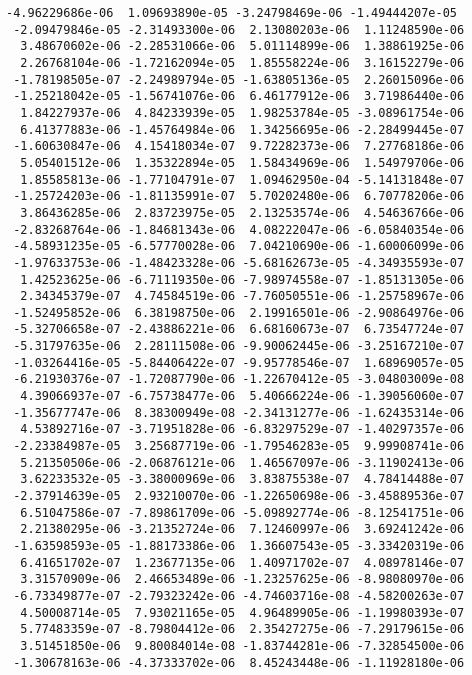 \documentclass[11pt]{article}
\begin{document}
\begin{Verbatim}[commandchars=\\\{\}]
 -4.96229686e-06  1.09693890e-05 -3.24798469e-06 -1.49444207e-05
 -2.09479846e-05 -2.31493300e-06  2.13080203e-06  1.11248590e-06
  3.48670602e-06 -2.28531066e-06  5.01114899e-06  1.38861925e-06
  2.26768104e-06 -1.72162094e-05  1.85558224e-06  3.16152279e-06
 -1.78198505e-07 -2.24989794e-05 -1.63805136e-05  2.26015096e-06
 -1.25218042e-05 -1.56741076e-06  6.46177912e-06  3.71986440e-06
  1.84227937e-06  4.84233939e-05  1.98253784e-05 -3.08961754e-06
  6.41377883e-06 -1.45764984e-06  1.34256695e-06 -2.28499445e-07
 -1.60630847e-06  4.15418034e-07  9.72282373e-06  7.27768186e-06
  5.05401512e-06  1.35322894e-05  1.58434969e-06  1.54979706e-06
  1.85585813e-06 -1.77104791e-07  1.09462950e-04 -5.14131848e-07
 -1.25724203e-06 -1.81135991e-07  5.70202480e-06  6.70778206e-06
  3.86436285e-06  2.83723975e-05  2.13253574e-06  4.54636766e-06
 -2.83268764e-06 -1.84681343e-06  4.08222047e-06 -6.05840354e-06
 -4.58931235e-05 -6.57770028e-06  7.04210690e-06 -1.60006099e-06
 -1.97633753e-06 -1.48423328e-06 -5.68162673e-05 -4.34935593e-07
  1.42523625e-06 -6.71119350e-06 -7.98974558e-07 -1.85131305e-06
  2.34345379e-07  4.74584519e-06 -7.76050551e-06 -1.25758967e-06
 -1.52495852e-06  6.38198750e-06  2.19916501e-06 -2.90864976e-06
 -5.32706658e-07 -2.43886221e-06  6.68160673e-07  6.73547724e-07
 -5.31797635e-06  2.28111508e-06 -9.90062445e-06 -3.25167210e-07
 -1.03264416e-05 -5.84406422e-07 -9.95778546e-07  1.68969057e-05
 -6.21930376e-07 -1.72087790e-06 -1.22670412e-05 -3.04803009e-08
  4.39066937e-07 -6.75738477e-06  5.40666224e-06 -1.39056060e-07
 -1.35677747e-06  8.38300949e-08 -2.34131277e-06 -1.62435314e-06
  4.53892716e-07 -3.71951828e-06 -6.83297529e-07 -1.40297357e-06
 -2.23384987e-05  3.25687719e-06 -1.79546283e-05  9.99908741e-06
  5.21350506e-06 -2.06876121e-06  1.46567097e-06 -3.11902413e-06
  3.62233532e-05 -3.38000969e-06  3.83875538e-07  4.78414488e-07
 -2.37914639e-05  2.93210070e-06 -1.22650698e-06 -3.45889536e-07
  6.51047586e-07 -7.89861709e-06 -5.09892774e-06 -8.12541751e-06
  2.21380295e-06 -3.21352724e-06  7.12460997e-06  3.69241242e-06
 -1.63598593e-05 -1.88173386e-06  1.36607543e-05 -3.33420319e-06
  6.41651702e-07  1.23677135e-06  1.40971702e-07  4.08978146e-07
  3.31570909e-06  2.46653489e-06 -1.23257625e-06 -8.98080970e-06
 -6.73349877e-07 -2.79323242e-06 -4.74603716e-08 -4.58200263e-07
  4.50008714e-05  7.93021165e-05  4.96489905e-06 -1.19980393e-07
  5.77483359e-07 -8.79804412e-06  2.35427275e-06 -7.29179615e-06
  3.51451850e-06  9.80084014e-08 -1.83744281e-06 -7.32854500e-06
 -1.30678163e-06 -4.37333702e-06  8.45243448e-06 -1.11928180e-06

\end{Verbatim}
\end{document}
